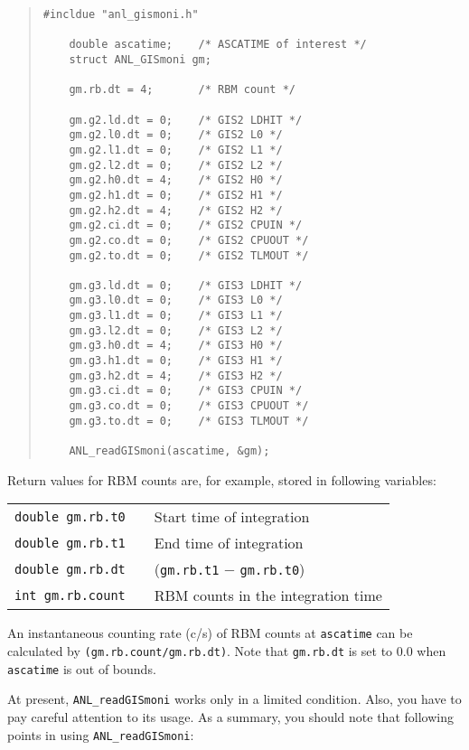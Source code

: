 \begin{quote}\baselineskip 3.2mm\begin{verbatim}
#incldue "anl_gismoni.h"

    double ascatime;    /* ASCATIME of interest */
    struct ANL_GISmoni gm;
    
    gm.rb.dt = 4;       /* RBM count */
    
    gm.g2.ld.dt = 0;    /* GIS2 LDHIT */
    gm.g2.l0.dt = 0;    /* GIS2 L0 */
    gm.g2.l1.dt = 0;    /* GIS2 L1 */
    gm.g2.l2.dt = 0;    /* GIS2 L2 */
    gm.g2.h0.dt = 4;    /* GIS2 H0 */
    gm.g2.h1.dt = 0;    /* GIS2 H1 */
    gm.g2.h2.dt = 4;    /* GIS2 H2 */
    gm.g2.ci.dt = 0;    /* GIS2 CPUIN */
    gm.g2.co.dt = 0;    /* GIS2 CPUOUT */
    gm.g2.to.dt = 0;    /* GIS2 TLMOUT */
    
    gm.g3.ld.dt = 0;    /* GIS3 LDHIT */
    gm.g3.l0.dt = 0;    /* GIS3 L0 */
    gm.g3.l1.dt = 0;    /* GIS3 L1 */
    gm.g3.l2.dt = 0;    /* GIS3 L2 */
    gm.g3.h0.dt = 4;    /* GIS3 H0 */
    gm.g3.h1.dt = 0;    /* GIS3 H1 */
    gm.g3.h2.dt = 4;    /* GIS3 H2 */
    gm.g3.ci.dt = 0;    /* GIS3 CPUIN */
    gm.g3.co.dt = 0;    /* GIS3 CPUOUT */
    gm.g3.to.dt = 0;    /* GIS3 TLMOUT */
        
    ANL_readGISmoni(ascatime, &gm);

\end{verbatim}\end{quote}

\noindent
Return values for RBM counts are, for example, stored in following variables:

\begin{center}
\begin{tabular}{lll}
	{\tt double gm.rb.t0} & & Start time of integration \\
	{\tt double gm.rb.t1} & & End time of integration \\
	{\tt double gm.rb.dt} & & ({\tt gm.rb.t1} $-$ {\tt gm.rb.t0}) \\
	{\tt int gm.rb.count} & & RBM counts in the integration time \\
\end{tabular}
\end{center}

\noindent
An instantaneous counting rate (c/s)
of RBM counts at {\tt ascatime}
can be calculated by {\tt (gm.rb.count/gm.rb.dt)}.
Note that {\tt gm.rb.dt} is set to 0.0
when {\tt ascatime} is out of bounds.

At present,
{\tt ANL\_readGISmoni} works only in a limited condition.
Also, you have to pay careful attention to its usage.
As a summary, you should note that following points in using
{\tt ANL\_readGISmoni}:

